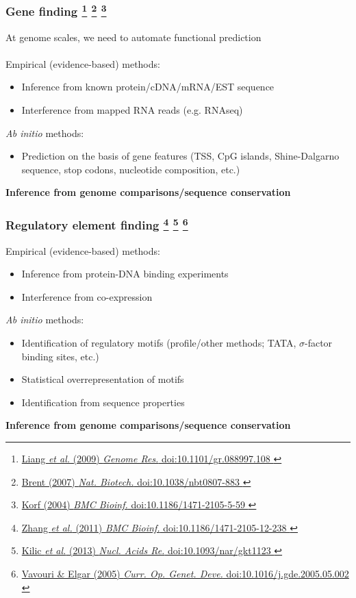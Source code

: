 
%
\begin{frame}
  \frametitle{Gene finding
  \footnote{\tiny{\href{http://dx.doi.org/10.1101/gr.088997.108
}{Liang \textit{et al.} (2009) \textit{Genome Res.} doi:10.1101/gr.088997.108
}}}
    \footnote{\tiny{\href{http://dx.doi.org/10.1038/nbt0807-883
}{Brent (2007) \textit{Nat. Biotech.} doi:10.1038/nbt0807-883
}}}
    \footnote{\tiny{\href{http://dx.doi.org/10.1186/1471-2105-5-59
}{Korf (2004) \textit{BMC Bioinf.} doi:10.1186/1471-2105-5-59
}}}
    }
  At genome scales, we need to automate functional prediction \\~\\    
  \textcolor{hutton_green}{Empirical (evidence-based) methods:}
  \begin{itemize}
    \item Inference from known protein/cDNA/mRNA/EST sequence
    \item Interference from mapped RNA reads (e.g. RNAseq)
  \end{itemize}
  \textcolor{hutton_blue}{\textit{Ab initio} methods:}
  \begin{itemize}
    \item Prediction on the basis of gene features (TSS, CpG islands, Shine-Dalgarno sequence, stop codons, nucleotide composition, etc.)
  \end{itemize}
  \textcolor{hutton_purple}{\textbf{Inference from genome comparisons/sequence conservation}}
\end{frame}

%
\begin{frame}
  \frametitle{Regulatory element finding
  \footnote{\tiny{\href{http://dx.doi.org/10.1186/1471-2105-12-238
}{Zhang \textit{et al.} (2011) \textit{BMC Bioinf.} doi:10.1186/1471-2105-12-238
}}}
    \footnote{\tiny{\href{http://dx.doi.org/10.1093/nar/gkt1123
}{Kilic \textit{et al.} (2013) \textit{Nucl. Acids Re.} doi:10.1093/nar/gkt1123
}}}
    \footnote{\tiny{\href{http://dx.doi.org/10.1016/j.gde.2005.05.002
}{Vavouri \& Elgar (2005) \textit{Curr. Op. Genet. Deve.} doi:10.1016/j.gde.2005.05.002
}}}
    }
  \textcolor{hutton_green}{Empirical (evidence-based) methods:}
  \begin{itemize}
    \item Inference from protein-DNA binding experiments
    \item Interference from co-expression
  \end{itemize}
  \textcolor{hutton_blue}{\textit{Ab initio} methods:}
  \begin{itemize}
    \item Identification of regulatory motifs (profile/other methods; TATA, $\sigma$-factor binding sites, etc.)
    \item Statistical overrepresentation of motifs
    \item Identification from sequence properties
  \end{itemize}
  \textcolor{hutton_purple}{\textbf{Inference from genome comparisons/sequence conservation}}
\end{frame}

